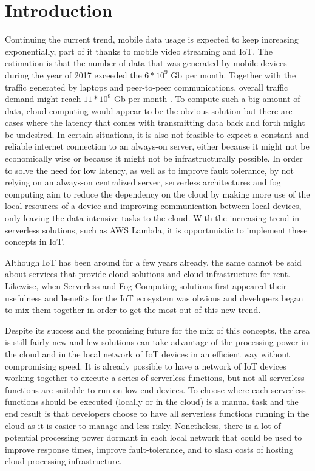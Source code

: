 \documentclass[conference]{IEEEtran}
\begin{document}
\section{Introduction}
Continuing the current trend, mobile data usage is expected to keep increasing
exponentially, part of it thanks to mobile video streaming and
IoT. The estimation is that the number of data that was generated
by mobile devices during the year of 2017 exceeded the $\displaystyle 6 * 10^9$ Gb
per month. Together with the traffic generated by laptops and peer-to-peer
communications, overall traffic demand might reach $\displaystyle 11 * 10^9$ Gb per
month\cite{kn:Dehos2014} \cite{kn:Baresi2017}. To compute such a big amount of
data, cloud computing would appear to be the obvious solution but there are cases
where the latency that comes with transmitting data back and forth might be
undesired. In certain situations, it is also not feasible to expect a constant and
reliable internet connection to an always-on server, either because it might not
be economically wise or because it might not be infrastructurally possible. In
order to solve the need for low latency, as well as to improve fault tolerance, by
not relying on an always-on centralized server, serverless architectures and fog
computing aim to reduce the dependency on the cloud by making more use of the
local resources of a device and improving communication between local devices,
only leaving the data-intensive tasks to the cloud\cite{kn:Baresi2017}. With the
increasing trend in serverless solutions, such as AWS Lambda, it is opportunistic
to implement these concepts in IoT.

Although IoT has been around for a few years already, the same cannot be said
about services that provide cloud solutions and cloud infrastructure for rent. 
Likewise, when Serverless and Fog Computing solutions first appeared their
usefulness and benefits for the IoT ecosystem was obvious and developers began to
mix them together in order to get the most out of this new trend.

Despite its success and the promising future for the mix of this concepts, the
area is still fairly new and few solutions can take advantage of the processing
power in the cloud and in the local network of IoT devices in an efficient way
without compromising speed. It is already possible to have a network of IoT
devices working together to execute a series of serverless functions, but not all
serverless functions are suitable to run on low-end devices. To choose where each
serverless functions should be executed (locally or in the cloud) is a manual task
and the end result is that developers choose to have all serverless functions
running in the cloud as it is easier to manage and less risky. Nonetheless, there
is a lot of potential processing power dormant in each local network that could
be used to improve response times, improve fault-tolerance,  and to slash costs of
hosting cloud processing infrastructure. 
\end{document}
